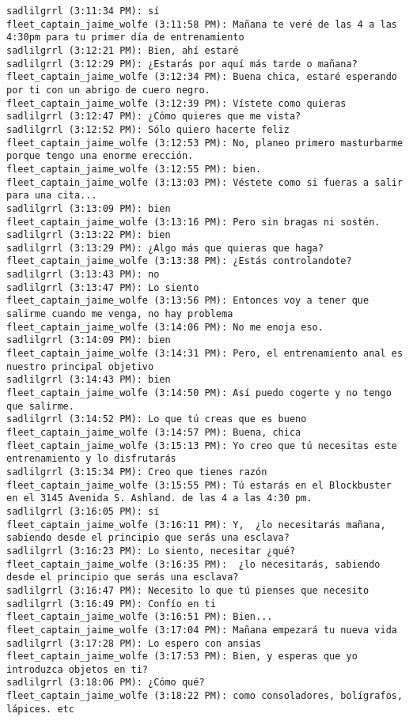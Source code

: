 \begin{verbatim}
sadlilgrrl (3:11:34 PM): sí
fleet_captain_jaime_wolfe (3:11:58 PM): Mañana te veré de las 4 a las 4:30pm para tu primer día de entrenamiento
sadlilgrrl (3:12:21 PM): Bien, ahí estaré
sadlilgrrl (3:12:29 PM): ¿Estarás por aquí más tarde o mañana?
fleet_captain_jaime_wolfe (3:12:34 PM): Buena chica, estaré esperando por ti con un abrigo de cuero negro.
fleet_captain_jaime_wolfe (3:12:39 PM): Vístete como quieras
sadlilgrrl (3:12:47 PM): ¿Cómo quieres que me vista?
sadlilgrrl (3:12:52 PM): Sólo quiero hacerte feliz
fleet_captain_jaime_wolfe (3:12:53 PM): No, planeo primero masturbarme porque tengo una enorme erección.
fleet_captain_jaime_wolfe (3:12:55 PM): bien.
fleet_captain_jaime_wolfe (3:13:03 PM): Véstete como si fueras a salir para una cita...
sadlilgrrl (3:13:09 PM): bien
fleet_captain_jaime_wolfe (3:13:16 PM): Pero sin bragas ni sostén.
sadlilgrrl (3:13:22 PM): bien
sadlilgrrl (3:13:29 PM): ¿Algo más que quieras que haga?
fleet_captain_jaime_wolfe (3:13:38 PM): ¿Estás controlandote?
sadlilgrrl (3:13:43 PM): no
sadlilgrrl (3:13:47 PM): Lo siento
fleet_captain_jaime_wolfe (3:13:56 PM): Entonces voy a tener que salirme cuando me venga, no hay problema
fleet_captain_jaime_wolfe (3:14:06 PM): No me enoja eso.
sadlilgrrl (3:14:09 PM): bien
fleet_captain_jaime_wolfe (3:14:31 PM): Pero, el entrenamiento anal es nuestro principal objetivo  
sadlilgrrl (3:14:43 PM): bien
fleet_captain_jaime_wolfe (3:14:50 PM): Así puedo cogerte y no tengo que salirme. 
sadlilgrrl (3:14:52 PM): Lo que tú creas que es bueno
fleet_captain_jaime_wolfe (3:14:57 PM): Buena, chica
fleet_captain_jaime_wolfe (3:15:13 PM): Yo creo que tú necesitas este entrenamiento y lo disfrutarás
sadlilgrrl (3:15:34 PM): Creo que tienes razón
fleet_captain_jaime_wolfe (3:15:55 PM): Tú estarás en el Blockbuster en el 3145 Avenida S. Ashland. de las 4 a las 4:30 pm. 
sadlilgrrl (3:16:05 PM): sí
fleet_captain_jaime_wolfe (3:16:11 PM): Y,  ¿lo necesitarás mañana, sabiendo desde el principio que serás una esclava?
sadlilgrrl (3:16:23 PM): Lo siento, necesitar ¿qué?
fleet_captain_jaime_wolfe (3:16:35 PM):  ¿lo necesitarás, sabiendo desde el principio que serás una esclava?
sadlilgrrl (3:16:47 PM): Necesito lo que tú pienses que necesito
sadlilgrrl (3:16:49 PM): Confío en ti
fleet_captain_jaime_wolfe (3:16:51 PM): Bien...
fleet_captain_jaime_wolfe (3:17:04 PM): Mañana empezará tu nueva vida
sadlilgrrl (3:17:28 PM): Lo espero con ansias
fleet_captain_jaime_wolfe (3:17:53 PM): Bien, y esperas que yo introduzca objetos en ti?
sadlilgrrl (3:18:06 PM): ¿Cómo qué?
fleet_captain_jaime_wolfe (3:18:22 PM): como consoladores, bolígrafos, lápices. etc

\end{verbatim}
